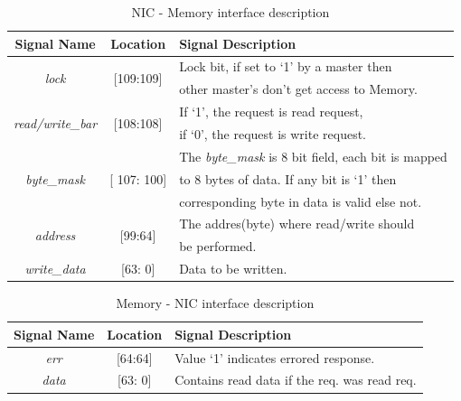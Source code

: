 \documentclass[12pt]{report}
\begin{document}
\begin{appendices}
				\begin{table}[!htbp]
					\centering
					\begin{tabular}{ccl}
						\hline
						\textbf{Signal Name} 			& \textbf{Location} 		&\textbf{Signal Description}  \\ \hline
						\multirow{2}{*}{\textit{lock}}		& \multirow{2}{*}{[109:109]}	& Lock bit, if set to `1' by a master then\\
											&				& other master's don't get access to Memory.\\ \hline
						\multirow{2}{*}{\textit{read/write\_bar}}& \multirow{2}{*}{[108:108]}	& If `1', the request is read request,\\ 
											& 				& if `0', the request is write request.\\ \hline
						\multirow{3}{*}{\textit{byte\_mask}}	& \multirow{3}{*}{[ 107: 100]}	& The \textit{byte\_mask} is 8 bit field, each bit is mapped\\
											&				& to 8 bytes of data. If any bit is `1' then\\
											& 				& corresponding byte in data is valid else not.\\ \hline 
						\multirow{2}{*}{\textit{address}}   	& \multirow{2}{*}{[99:64]} 	& The addres(byte) where read/write should\\ 
											&				& be performed.\\ \hline
						\textit{write\_data}   			& [63: 0] 			& Data to be written.\\ \hline
					\end{tabular}
					\caption{NIC - Memory interface description}
					\label{tab:NIC-Memory-interface-req}
				\end{table}

				\begin{table}[!htbp]
					\centering
					\begin{tabular}{ccl}
						\hline
						\textbf{Signal Name} 		& \textbf{Location} 		&\textbf{Signal Description}  \\ \hline
						\textit{err}			& [64:64]			& Value `1' indicates errored response.\\\hline
						\textit{data}   		& [63: 0] 			& Contains read data if the req. was read req.\\ \hline
					\end{tabular}
					\caption{Memory - NIC interface description}
					\label{tab:Memory-NIC-interface-resp}
				\end{table}
			

\end{appendices}
\end{document}
